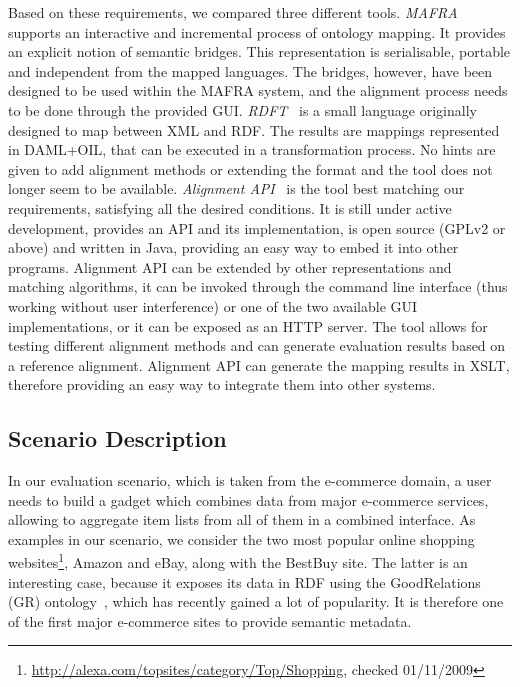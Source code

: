 Based on these requirements, we compared three different tools. \emph{MAFRA}~\cite{maedche2002mafra} supports an interactive and incremental process of ontology mapping. It provides an explicit notion of semantic bridges. This representation is serialisable, portable and independent from the mapped languages. The bridges, however, have been designed to be used within the MAFRA system, and the alignment process needs to be done through the provided GUI. \emph{RDFT}~\cite{omelayenko2002rdft} is a small language originally designed to map between XML and RDF. The results are mappings represented in DAML+OIL, that can be executed in a transformation process. No hints are given to add alignment methods or extending the format and the tool does not longer seem to be available. \emph{Alignment API}~\cite{euzenat2004api} is the tool best matching our requirements, satisfying all the desired conditions. It is still under active development, provides an API and its implementation, is open source (GPLv2 or above) and written in Java, providing an easy way to embed it into other programs. Alignment API can be extended by other representations and matching algorithms, it can be invoked through the command line interface (thus working without user interference) or one of the two available GUI implementations, or it can be exposed as an HTTP server. The tool allows for testing different alignment methods and can generate evaluation results based on a reference alignment. Alignment API can generate the mapping results in XSLT, therefore providing an easy way to integrate them into other systems.

\subsection{Scenario Description}
\label{scenario}

In our evaluation scenario, which is taken from the e-commerce domain, a user needs to build a gadget which combines data from major e-commerce services, allowing to aggregate item lists from all of them in a combined interface.
As examples in our scenario, we consider the two most popular online shopping websites\footnote{\url{http://alexa.com/topsites/category/Top/Shopping}, checked 01/11/2009}, Amazon and eBay, along with the BestBuy site. The latter is an interesting case, because it exposes its data in RDF using the GoodRelations (GR) ontology~\cite{hepp-goodrelations}, which has recently gained a lot of popularity. It is therefore one of the first major e-commerce sites to provide semantic metadata.


